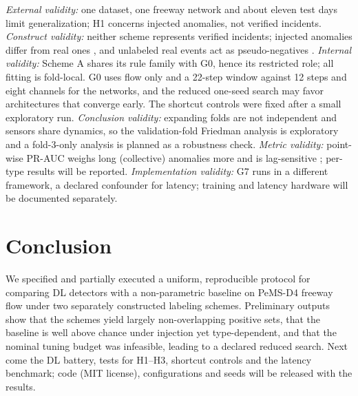 \documentclass[conference]{IEEEtran}
\begin{document}
\emph{External validity:} one dataset, one freeway network and about eleven
test days limit generalization; H1 concerns injected anomalies, not verified
incidents. \emph{Construct validity:} neither scheme represents verified incidents;
injected anomalies differ from real ones \cite{carmona2022ncad}, and
unlabeled real events act as pseudo-negatives \cite{goswami2023unsupervised}.
\emph{Internal validity:} Scheme A shares its rule family with G0, hence its
restricted role; all fitting is fold-local. G0 uses flow only and a 22-step
window against 12 steps and eight channels for the networks, and the
reduced one-seed search may favor architectures that converge early. The
shortcut controls were fixed after a small exploratory run.
\emph{Conclusion validity:}
expanding folds are not independent and sensors share dynamics, so the
validation-fold Friedman analysis is exploratory and a fold-3-only analysis
is planned as a robustness check. \emph{Metric validity:} point-wise PR-AUC
weighs long (collective) anomalies more and is lag-sensitive
\cite{sorbo2024navigating,liu2024elephant}; per-type results will be
reported. \emph{Implementation validity:} G7 runs in a different framework,
a declared confounder for latency; training and latency hardware will be
documented separately.

\section{Conclusion}

We specified and partially executed a uniform, reproducible protocol for
comparing DL detectors with a non-parametric baseline on PeMS-D4 freeway
flow under two separately constructed labeling schemes. Preliminary outputs
show that the schemes yield largely non-overlapping positive sets, that the
baseline is well above chance under injection yet type-dependent, and that
the nominal tuning budget was infeasible, leading to a declared reduced
search. Next come the DL battery, tests for H1--H3, shortcut controls and
the latency benchmark; code (MIT license), configurations and seeds will be
released with the results.



\end{document}
